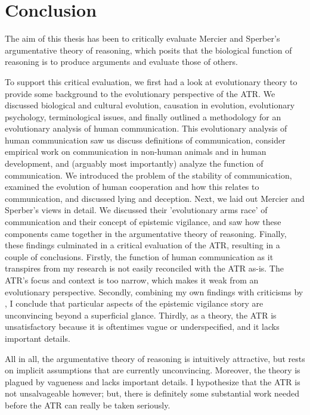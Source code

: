 \chapter{Conclusion}
\label{ch:conclusion}

The aim of this thesis has been to critically evaluate Mercier and Sperber's argumentative theory of reasoning, which posits that the biological function of reasoning is to produce arguments and evaluate those of others.

To support this critical evaluation, we first had a look at evolutionary theory to provide some background to the evolutionary perspective of the ATR.
We discussed biological and cultural evolution, causation in evolution, evolutionary psychology, terminological issues, and finally outlined a methodology for an evolutionary analysis of human communication.
This evolutionary analysis of human communication saw us discuss definitions of communication, consider empirical work on communication in non-human animals and in human development, and (arguably most importantly) analyze the function of communication. We introduced the problem of the stability of communication, examined the evolution of human cooperation and how this relates to communication, and discussed lying and deception.
Next, we laid out Mercier and Sperber's views in detail. We discussed their 'evolutionary arms race' of communication and their concept of epistemic vigilance, and saw how these components came together in the argumentative theory of reasoning.
Finally, these findings culminated in a critical evaluation of the ATR, resulting in a couple of conclusions. Firstly, the function of human communication as it transpires from my research is not easily reconciled with the ATR as-is. The ATR's focus and context is too narrow, which makes it weak from an evolutionary perspective.
Secondly, combining my own findings with criticisms by \citet{Michaelian13}, I conclude that particular aspects of the epistemic vigilance story are unconvincing beyond a superficial glance.
Thirdly, as a theory, the ATR is unsatisfactory because it is oftentimes vague or underspecified, and it lacks important details.

All in all, the argumentative theory of reasoning is intuitively attractive, but rests on implicit assumptions that are currently unconvincing. Moreover, the theory is plagued by vagueness and lacks important details. I hypothesize that the ATR is not unsalvageable however; but, there is definitely some substantial work needed before the ATR can really be taken seriously.

